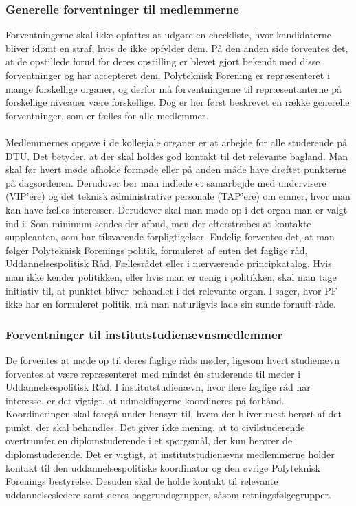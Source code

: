 \subsubsection{Generelle forventninger til medlemmerne}
Forventningerne skal ikke opfattes at udgøre en checkliste, hvor kandidaterne bliver idømt en straf, hvis de ikke opfylder dem. På den anden side forventes det, at de opstillede forud for deres opstilling er blevet gjort bekendt med disse forventninger og har accepteret dem. Polyteknisk Forening er repræsenteret i mange forskellige organer, og derfor må forventningerne til repræsentanterne på forskellige niveauer være forskellige. Dog er her først beskrevet en række generelle forventninger, som er fælles for alle medlemmer.\\
\\
Medlemmernes opgave i de kollegiale organer er at arbejde for alle studerende på DTU. Det betyder, at der skal holdes god kontakt til det relevante bagland. Man skal før hvert møde afholde formøde eller på anden måde have drøftet
punkterne på dagsordenen. Derudover bør man indlede et samarbejde med undervisere (VIP’ere) og det teknisk administrative personale (TAP’ere) om emner, hvor man kan have fælles interesser. Derudover skal man møde op i det organ man er valgt ind i. Som minimum sendes der afbud, men der efterstræbes at kontakte suppleanten, som har tilsvarende forpligtigelser. Endelig forventes det, at man følger Polyteknisk Forenings politik, formuleret af enten det faglige råd, Uddannelsespolitisk Råd, Fællesrådet eller i nærværende principkatalog. Hvis man ikke kender politikken, eller hvis man er uenig i politikken, skal man tage initiativ til, at punktet bliver behandlet i det relevante organ. I sager, hvor PF ikke har en formuleret politik, må man naturligvis lade sin sunde fornuft råde. 

\subsubsection{Forventninger til institutstudienævnsmedlemmer}
De forventes at møde op til deres faglige råds møder, ligesom hvert studienævn forventes at være repræsenteret med mindst én studerende til møder i Uddannelsespolitisk Råd. I institutstudienævn, hvor flere faglige råd har interesse, er det vigtigt, at udmeldingerne koordineres på forhånd. Koordineringen skal foregå under hensyn til, hvem der bliver mest berørt af det punkt, der skal behandles. Det giver ikke mening, at to civilstuderende overtrumfer en diplomstuderende i et spørgsmål, der kun berører de diplomstuderende. Det er vigtigt, at institutstudienævns medlemmerne holder kontakt til den uddannelsespolitiske koordinator og den øvrige Polyteknisk Forenings bestyrelse. Desuden skal de holde kontakt til relevante uddannelsesledere samt deres baggrundsgrupper, såsom retningsfølgegrupper.

